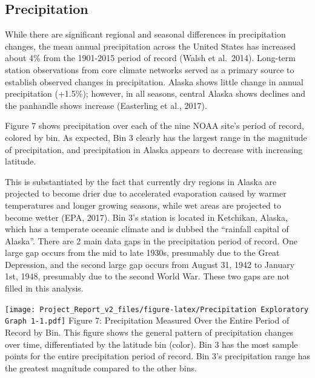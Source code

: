\documentclass[12pt,]{article}
\begin{document}
\hypertarget{precipitation}{%
\subsection{Precipitation}\label{precipitation}}

While there are significant regional and seasonal differences in
precipitation changes, the mean annual precipitation across the United
States has increased about 4\% from the 1901-2015 period of record
(Walsh et al.~2014). Long-term station observations from core climate
networks served as a primary source to establish observed changes in
precipitation. Alaska shows little change in annual precipitation
(+1.5\%); however, in all seasons, central Alaska shows declines and the
panhandle shows increase (Easterling et al., 2017).

Figure 7 shows precipitation over each of the nine NOAA site's period of
record, colored by bin. As expected, Bin 3 clearly has the largest range
in the magnitude of precipitation, and precipitation in Alaska appears
to decrease with increasing latitude.

This is substantiated by the fact that currently dry regions in Alaska
are projected to become drier due to accelerated evaporation caused by
warmer temperatures and longer growing seasons, while wet areas are
projected to become wetter (EPA, 2017). Bin 3's station is located in
Ketchikan, Alaska, which has a temperate oceanic climate and is dubbed
the ``rainfall capital of Alaska''. There are 2 main data gaps in the
precipitation period of record. One large gap occurs from the mid to
late 1930s, presumably due to the Great Depression, and the second large
gap occurs from August 31, 1942 to January 1st, 1948, presumably due to
the second World War. These two gaps are not filled in this analysis.

\texttt{[image: Project\_Report\_v2\_files/figure-latex/Precipitation Exploratory Graph 1-1.pdf]}
Figure 7: Precipitation Measured Over the Entire Period of Record by
Bin. This figure shows the general pattern of precipitation changes over
time, differentiated by the latitude bin (color). Bin 3 has the most
sample points for the entire precipitation period of record. Bin 3's
precipitation range has the greatest magnitude compared to the other
bins.
\end{document}
